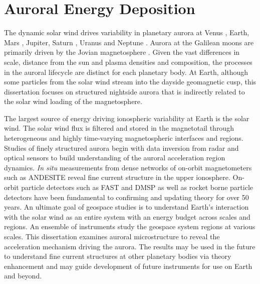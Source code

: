 \section{Auroral Energy Deposition}
The dynamic solar wind drives variability in planetary aurora at Venus \citep{phillips1986,gerard2008}, Earth, Mars \citep{bisikalo2017}, Jupiter, Saturn \citep{kivelson2005}, Uranus and Neptune \citep{arridge2015}.
Aurora at the Galilean moons are primarily driven by the Jovian magnetosphere \citep{lavrukhin2015,roth2016}.
Given the vast differences in scale, distance from the sun and plasma densities and composition, the processes in the auroral lifecycle are distinct for each planetary body.
At Earth, although some particles from the solar wind stream into the dayside geomagnetic cusp, this dissertation focuses on structured nightside aurora that is indirectly related to the solar wind loading of the magnetosphere.

The largest source of energy driving ionospheric variability at Earth is the solar wind.
The solar wind flux is filtered and stored in the magnetotail through heterogeneous and highly time-varying magnetospheric interfaces and regions.
Studies of finely structured aurora begin with data inversion from radar and optical sensors to build understanding of the auroral acceleration region dynamics. 
\textit{In situ} measurements from dense networks of on-orbit magnetometers such as ANDESITE \citep{parham2016} reveal fine current structure in the upper ionosphere.
On-orbit particle detectors such as FAST and DMSP as well as rocket borne particle detectors have been fundamental to confirming and updating theory for over 50 years.
An ultimate goal of geospace studies is to understand Earth's interaction with the solar wind as an entire system with an energy budget across scales and regions.
An ensemble of instruments study the geospace system regions at various scales. 
This dissertation examines auroral microstructure to reveal the acceleration mechanism driving the aurora.
The results may be used in the future to understand fine current structures at other planetary bodies via theory enhancement and may guide development of future instruments for use on Earth and beyond.

